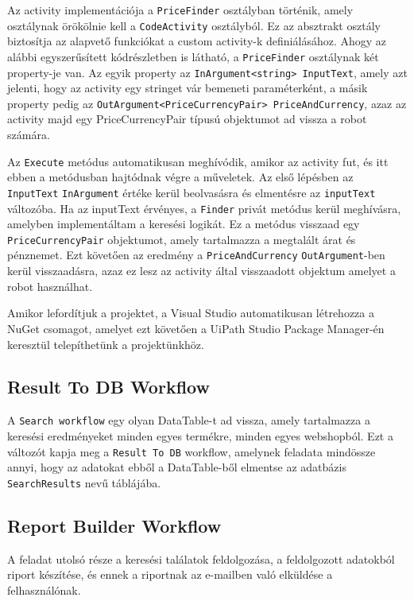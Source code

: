 \documentclass[
]{thesis-ekf}
\theoremstyle{definition}
\theoremstyle{remark}
\begin{document}


Az activity implementációja a \texttt{PriceFinder} osztályban történik, amely osztálynak örökölnie kell a \texttt{CodeActivity} osztályból. Ez az absztrakt osztály biztosítja az alapvető funkciókat a custom activity-k definiálásához. Ahogy az alábbi egyszerűsített kódrészletben is látható, a \texttt{PriceFinder} osztálynak két property-je van. Az egyik property az \texttt{InArgument<string> InputText}, amely azt jelenti, hogy az activity egy stringet vár bemeneti paraméterként, a másik property pedig az \texttt{OutArgument<PriceCurrencyPair> PriceAndCurrency}, azaz az activity majd egy PriceCurrencyPair típusú objektumot ad vissza a robot számára.

Az \texttt{Execute} metódus automatikusan meghívódik, amikor az activity fut, és itt ebben a metódusban hajtódnak végre a műveletek. Az első lépésben az \texttt{InputText} \texttt{InArgument} értéke kerül beolvasásra és elmentésre az \texttt{inputText} változóba. Ha az inputText érvényes, a \texttt{Finder} privát metódus kerül meghívásra, amelyben implementáltam a keresési logikát. Ez a metódus visszaad egy \texttt{PriceCurrencyPair} objektumot, amely tartalmazza a megtalált árat és pénznemet. Ezt követően az eredmény a \texttt{PriceAndCurrency} \texttt{OutArgument}-ben kerül visszaadásra, azaz ez lesz az activity által visszaadott objektum amelyet a robot használhat.



Amikor lefordítjuk a projektet, a Visual Studio automatikusan létrehozza a NuGet csomagot, amelyet ezt követően a UiPath Studio Package Manager-én keresztül telepíthetünk a projektünkhöz.

\subsection{Result To DB Workflow}
A \texttt{Search workflow} egy olyan DataTable-t ad vissza, amely tartalmazza a keresési eredményeket minden egyes termékre, minden egyes webshopból. Ezt a változót kapja meg a \texttt{Result To DB} workflow, amelynek feladata mindössze annyi, hogy az adatokat ebből a DataTable-ből elmentse az adatbázis \texttt{SearchResults} nevű táblájába.

\subsection{Report Builder Workflow}
A feladat utolsó része a keresési találatok feldolgozása, a feldolgozott adatokból riport készítése, és ennek a riportnak az e-mailben való elküldése a felhasználónak. 
\end{document}

